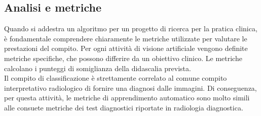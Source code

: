\documentclass[12pt,a4paper]{report}
\begin{document}
\subsection{Analisi e metriche}
Quando si addestra un algoritmo per un progetto di ricerca per la pratica clinica, è fondamentale comprendere chiaramente le metriche utilizzate per valutare le prestazioni del compito. Per ogni attività di visione artificiale vengono definite metriche specifiche, che possono differire da un obiettivo clinico. Le metriche calcolano i punteggi di somiglianza della didascalia prevista.\\
Il compito di classificazione è strettamente correlato al comune compito interpretativo radiologico di fornire una diagnosi dalle immagini. Di conseguenza, per questa attività, le metriche di apprendimento automatico sono molto simili alle consuete metriche dei test diagnostici riportate in radiologia diagnostica.
\end{document}
